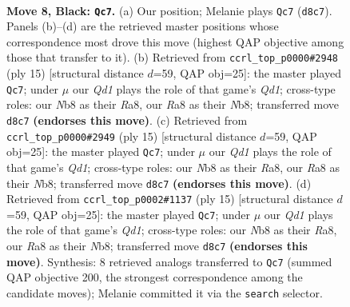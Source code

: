 \documentclass[11pt]{article}
\begin{document}
\begin{figure}[p]\centering
\begin{subfigure}{0.46\textwidth}\centering
\resizebox{\linewidth}{!}{%
\newchessgame
\chessboard[
  setfen={rnbqk2r/pp2p1bp/3ppnp1/8/4P3/2N1BQ2/PPP2PPP/R3KB1R b KQkq - 1 8},
  showmover=false,
  pgfstyle=straightmove, color=movearrow, markmove={d8-c7}
]}
\caption{}
\end{subfigure}\hfill
\begin{subfigure}{0.46\textwidth}\centering
\resizebox{\linewidth}{!}{%
\newchessgame
\chessboard[
  setfen={rnbqk2r/1p2bppp/p2ppn2/6B1/3NPP2/2N2Q2/PPP3PP/R3KB1R b KQkq - 2 8},
  showmover=false,
  pgfstyle=straightmove, color=movearrow, markmove={d8-c7}
]}
\caption{}
\end{subfigure}
\\[4pt]
\begin{subfigure}{0.46\textwidth}\centering
\resizebox{\linewidth}{!}{%
\newchessgame
\chessboard[
  setfen={rnbqk2r/1p2bppp/p2ppn2/6B1/3NPP2/2N2Q2/PPP3PP/R3KB1R b KQkq - 2 8},
  showmover=false,
  pgfstyle=straightmove, color=movearrow, markmove={d8-c7}
]}
\caption{}
\end{subfigure}\hfill
\begin{subfigure}{0.46\textwidth}\centering
\resizebox{\linewidth}{!}{%
\newchessgame
\chessboard[
  setfen={rnbqk2r/1p2bppp/p2ppn2/6B1/3NPP2/2N2Q2/PPP3PP/R3KB1R b KQkq - 2 8},
  showmover=false,
  pgfstyle=straightmove, color=movearrow, markmove={d8-c7}
]}
\caption{}
\end{subfigure}
\caption{\textbf{Move 8, Black: \texttt{Qc7}.} (a) Our position; Melanie plays \texttt{Qc7} (\texttt{d8c7}). Panels (b)--(d) are the retrieved master positions whose correspondence most drove this move (highest QAP objective among those that transfer to it). (b) Retrieved from \texttt{ccrl\_top\_p0000\#2948} (ply 15) [structural distance $d$=59, QAP obj=25]: the master played \texttt{Qc7}; under $\mu$ our \emph{Qd1} plays the role of that game's \emph{Qd1}; cross-type roles: our \emph{N}b8 as their \emph{R}a8, our \emph{R}a8 as their \emph{N}b8; transferred move \texttt{d8c7} \textbf{(endorses this move)}. (c) Retrieved from \texttt{ccrl\_top\_p0000\#2949} (ply 15) [structural distance $d$=59, QAP obj=25]: the master played \texttt{Qc7}; under $\mu$ our \emph{Qd1} plays the role of that game's \emph{Qd1}; cross-type roles: our \emph{N}b8 as their \emph{R}a8, our \emph{R}a8 as their \emph{N}b8; transferred move \texttt{d8c7} \textbf{(endorses this move)}. (d) Retrieved from \texttt{ccrl\_top\_p0002\#1137} (ply 15) [structural distance $d$=59, QAP obj=25]: the master played \texttt{Qc7}; under $\mu$ our \emph{Qd1} plays the role of that game's \emph{Qd1}; cross-type roles: our \emph{N}b8 as their \emph{R}a8, our \emph{R}a8 as their \emph{N}b8; transferred move \texttt{d8c7} \textbf{(endorses this move)}. Synthesis: 8 retrieved analogs transferred to \texttt{Qc7} (summed QAP objective 200, the strongest correspondence among the candidate moves); Melanie committed it via the \texttt{search} selector.}
\label{fig:thought-m15}
\end{figure}
\end{document}
